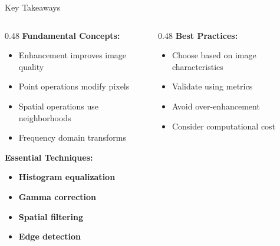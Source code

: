 \documentclass[aspectratio=169,10pt]{beamer}
\begin{document}
\begin{frame}{Key Takeaways}
\begin{columns}
\begin{column}{0.48\textwidth}
\textbf{Fundamental Concepts:}
\begin{itemize}
\item Enhancement improves image quality
\item Point operations modify pixels
\item Spatial operations use neighborhoods
\item Frequency domain transforms
\end{itemize}

\textbf{Essential Techniques:}
\begin{itemize}
\item \textbf{Histogram equalization}
\item \textbf{Gamma correction}
\item \textbf{Spatial filtering}
\item \textbf{Edge detection}
\end{itemize}
\end{column}
\begin{column}{0.48\textwidth}
\textbf{Best Practices:}
\begin{itemize}
\item Choose based on image characteristics
\item Validate using metrics
\item Avoid over-enhancement
\item Consider computational cost
\end{itemize}
\end{column}
\end{columns}
\end{frame}
\end{document}
